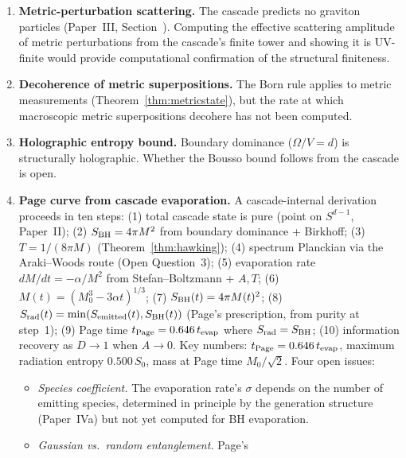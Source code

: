 \documentclass[12pt,a4paper]{article}
\begin{document}
\begin{enumerate}
evaluated at layer~$d$, producing a variational derivation of $G_d$; an
independent sphere-area identity at layer~$d$ equal to $d/4$; or a
direct computation from the cascade's embedding data at dimension~$d$.
A second derivation would promote Theorem~\ref{thm:Gd} from
``structural matching'' to ``doubly-derived,'' tightening the BTZ
cross-check from self-consistency to independent corroboration.
\item \textbf{Metric-perturbation scattering.} The cascade predicts no
graviton particles (Paper~III, Section~). Computing the effective
scattering amplitude of metric perturbations from the cascade's finite
tower and showing it is UV-finite would provide computational confirmation
of the structural finiteness.
\item \textbf{Decoherence of metric superpositions.} The Born rule applies
to metric measurements (Theorem~\ref{thm:metricstate}), but the rate at
which macroscopic metric superpositions decohere has not been computed.
\item \textbf{Holographic entropy bound.} Boundary dominance
($\Omega/V = d$) is structurally holographic. Whether the Bousso bound
follows from the cascade is open.
\item\label{oq:page-curve} \textbf{Page curve from cascade
evaporation.} A cascade-internal derivation proceeds in ten steps:
(1) total cascade state is pure (point on $S^{d-1}$, Paper~II);
(2) $S_{\rm BH} = 4\pi M^2$ from boundary dominance + Birkhoff;
(3) $T = 1/(8\pi M)$ (Theorem~\ref{thm:hawking});
(4) spectrum Planckian via the Araki--Woods route (Open
Question~3); (5) evaporation rate $dM/dt = -\alpha/M^2$ from
Stefan--Boltzmann + $A,T$; (6) $M(t) = (M_0^3 - 3\alpha t)^{1/3}$;
(7) $S_{\rm BH}(t) = 4\pi M(t)^2$;
(8) $S_{\rm rad}(t) = \min(S_{\rm emitted}(t), S_{\rm BH}(t))$
(Page's prescription, from purity at step~1); (9) Page time
$t_{\rm Page} = 0.646\, t_{\rm evap}$ where $S_{\rm rad}=S_{\rm BH}$;
(10) information recovery as $D\to 1$ when $A\to 0$. Key numbers:
$t_{\rm Page} = 0.646\, t_{\rm evap}$, maximum radiation entropy
$0.500\, S_0$, mass at Page time $M_0/\sqrt{2}$. Four open issues:
\begin{itemize}
\item \emph{Species coefficient.} The evaporation rate's
$\sigma$ depends on the number of emitting species, determined in
principle by the generation structure (Paper~IVa) but not yet
computed for BH evaporation.
\item \emph{Gaussian vs.\ random entanglement.} Page's

\end{itemize}
\end{enumerate}
\end{document}
